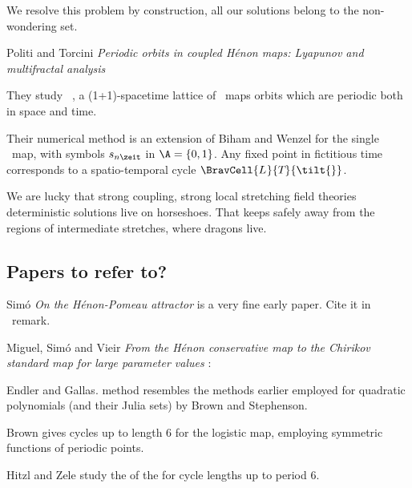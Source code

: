 We resolve this problem by construction, all our solutions belong to the
non-wondering set.

Politi and Torcini {\em Periodic
orbits in coupled {H{\'e}non} maps: {Lyapunov} and multifractal analysis}

They study \emph{\spt\ \Henon}, a (1+1)-spacetime lattice of
\Henon\ maps orbits which are periodic both in space and time.

Their numerical method is an extension of Biham and Wenzel for
the single \Henon\ map, with symbols $\Ssym{n\zeit}$ in $\A=\{0,1\}$. Any
fixed point in fictitious time corresponds to a spatio-temporal cycle
$\BravCell{\speriod{}}{\period{}}{\tilt{}}$.


We are lucky that strong coupling, strong local stretching field theories
deterministic solutions live on horseshoes. That keeps safely away from the
regions of intermediate stretches, where dragons live.

\subsection{Papers to refer to?}

Sim{\'o} {\em On the {H{\'e}non-Pomeau} attractor}
is a very fine early paper. Cite it in \Henon\ remark.

Miguel, Sim{\'{o}} and Vieir {\em From the {H{\'{e}}non}
conservative map to the {Chirikov} standard map for large parameter
values} :

Endler and Gallas.
method resembles the methods
earlier employed for quadratic polynomials (and their Julia sets) by
Brown
and Stephenson.

Brown gives cycles up to length 6 for the logistic map,
employing symmetric functions of periodic points.

Hitzl and Zele
study the of the {\HenonMap} for cycle lengths  up to period  6.
